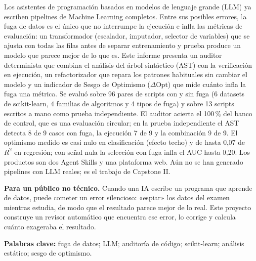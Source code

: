\documentclass{udla-capstone}
\newcommand{\DOpt}{\ensuremath{\Delta\mathrm{Opt}}}
\begin{document}

\portada

\newpage

\begin{resumen}
Los asistentes de programación basados en modelos de lenguaje grande (LLM) ya escriben pipelines de Machine Learning completos. Entre sus posibles errores, la fuga de datos es el único que no interrumpe la ejecución e infla las métricas de evaluación: un transformador (escalador, imputador, selector de variables) que se ajusta con todas las filas antes de separar entrenamiento y prueba produce un modelo que parece mejor de lo que es. Este informe presenta un auditor determinista que combina el análisis del árbol sintáctico (AST) con la verificación en ejecución, un refactorizador que repara los patrones habituales sin cambiar el modelo y un indicador de Sesgo de Optimismo (\DOpt) que mide cuánto infla la fuga una métrica. Se evaluó sobre 96 pares de scripts con y sin fuga (6 datasets de scikit-learn, 4 familias de algoritmos y 4 tipos de fuga) y sobre 13 scripts escritos a mano como prueba independiente. El auditor acierta el 100\,\% del banco de control, que es una evaluación circular; en la prueba independiente el AST detecta 8 de 9 casos con fuga, la ejecución 7 de 9 y la combinación 9 de 9. El optimismo medido es casi nulo en clasificación (efecto techo) y de hasta 0,07 de $R^2$ en regresión; con señal nula la selección con fuga infla el AUC hasta 0,20. Los productos son dos Agent Skills y una plataforma web. Aún no se han generado pipelines con LLM reales; es el trabajo de Capstone II.

\medskip
\noindent\textbf{Para un público no técnico.} Cuando una IA escribe un programa que aprende de datos, puede cometer un error silencioso: «espiar» los datos del examen mientras estudia, de modo que el resultado parece mejor de lo real. Este proyecto construye un revisor automático que encuentra ese error, lo corrige y calcula cuánto exageraba el resultado.
\end{resumen}

\begin{center}
    \textbf{Palabras clave:} fuga de datos; LLM; auditoría de código; scikit-learn; análisis estático; sesgo de optimismo.
\end{center}

\newpage
\end{document}
